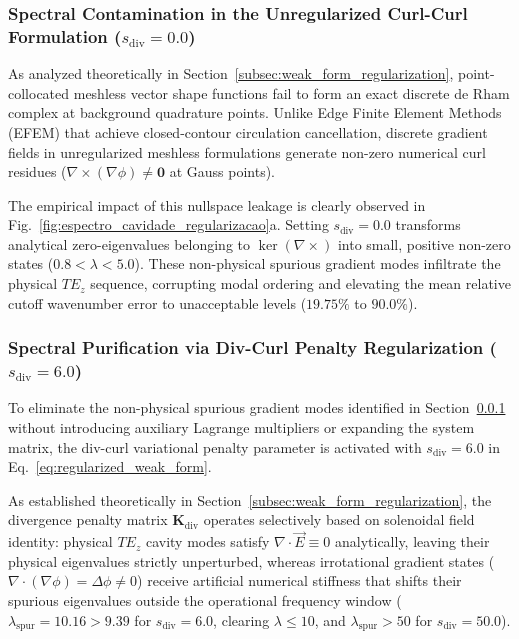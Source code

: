 \documentclass[preprint,12pt]{elsarticle}
\begin{document}
\subsubsection{Spectral Contamination in the Unregularized Curl-Curl Formulation ($s_{\mathrm{div}} = 0.0$)}
\label{subsubsec:unregularized_formulation}

As analyzed theoretically in Section~\ref{subsec:weak_form_regularization}, point-collocated meshless vector shape functions fail to form an exact discrete de Rham complex at background quadrature points. Unlike Edge Finite Element Methods (EFEM) that achieve closed-contour circulation cancellation, discrete gradient fields in unregularized meshless formulations generate non-zero numerical curl residues ($\nabla \times (\nabla \phi) \neq \mathbf{0}$ at Gauss points).

The empirical impact of this nullspace leakage is clearly observed in Fig.~\ref{fig:espectro_cavidade_regularizacao}a. Setting $s_{\mathrm{div}} = 0.0$ transforms analytical zero-eigenvalues belonging to $\ker(\nabla \times)$ into small, positive non-zero states ($0.8 < \lambda < 5.0$). These non-physical spurious gradient modes infiltrate the physical $TE_z$ sequence, corrupting modal ordering and elevating the mean relative cutoff wavenumber error to unacceptable levels ($19.75\%$ to $90.0\%$).

\subsubsection{Spectral Purification via Div-Curl Penalty Regularization ($s_{\mathrm{div}} = 6.0$)}
\label{subsubsec:regularized_formulation}

To eliminate the non-physical spurious gradient modes identified in Section~\ref{subsubsec:unregularized_formulation} without introducing auxiliary Lagrange multipliers or expanding the system matrix, the div-curl variational penalty parameter is activated with $s_{\mathrm{div}} = 6.0$ in Eq.~\eqref{eq:regularized_weak_form}.

As established theoretically in Section~\ref{subsec:weak_form_regularization}, the divergence penalty matrix $\mathbf{K}_{\mathrm{div}}$ operates selectively based on solenoidal field identity: physical $TE_z$ cavity modes satisfy $\nabla \cdot \vec{E} \equiv 0$ analytically, leaving their physical eigenvalues strictly unperturbed, whereas irrotational gradient states ($\nabla \cdot (\nabla \phi) = \Delta \phi \neq 0$) receive artificial numerical stiffness that shifts their spurious eigenvalues outside the operational frequency window ($\lambda_{\mathrm{spur}} = 10.16 > 9.39$ for $s_{\mathrm{div}} = 6.0$, clearing $\lambda \le 10$, and $\lambda_{\mathrm{spur}} > 50$ for $s_{\mathrm{div}} = 50.0$).
\end{document}
